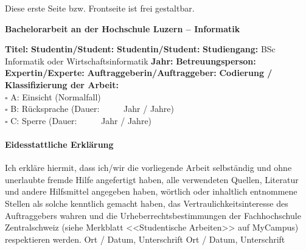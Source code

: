 \documentclass[10.5pt]{article}
\begin{document}
{\color{red}Diese erste Seite bzw. Frontseite ist frei gestaltbar.}
\newpage

\noindent
\fontsize{12}{14}
\textbf{Bachelorarbeit an der Hochschule Luzern -- Informatik} \\ \vspace*{0.6cm}

\fontsize{10.5}{12}
\noindent
\textbf{Titel:} \newline \newline
\textbf{Studentin/Student:} \newline \newline
\textbf{Studentin/Student:} \newline \newline
\textbf{Studiengang:} BSc Informatik oder Wirtschaftsinformatik \newline \newline
\textbf{Jahr:} \newline \newline
\textbf{Betreuungsperson:} \newline \newline
\textbf{Expertin/Experte:} \newline \newline
\textbf{Auftraggeberin/Auftraggeber:} \newline \newline \newline
\textbf{Codierung / Klassifizierung der Arbeit:}\\
$\square$ A: Einsicht 	(Normalfall) \\
$\square$ B: R\"ucksprache	(Dauer:  \ \ \ \ \     Jahr / Jahre)\\
$\square$ C: Sperre	(Dauer:  \ \ \ \ \     Jahr / Jahre)\\




\paragraph{\textbf{Eidesstattliche Erkl\"arung}}
Ich erkl\"are hiermit, dass ich/wir die vorliegende Arbeit selbst\"andig und ohne unerlaubte fremde Hilfe angefertigt haben, alle verwendeten Quellen, Literatur und andere Hilfsmittel angegeben haben, w\"ortlich oder inhaltlich entnommene Stellen als solche kenntlich gemacht haben, das Vertraulichkeitsinteresse des Auftraggebers wahren und die Urheberrechtsbestimmungen der Fachhochschule Zentralschweiz (siehe Merkblatt <<Studentische Arbeiten>> auf MyCampus) respektieren werden. \newline \newline 
Ort / Datum, Unterschrift	\underline{\hspace*{4cm}} \newline \newline
Ort / Datum, Unterschrift	\underline{\hspace*{4cm}} 
\end{document}
